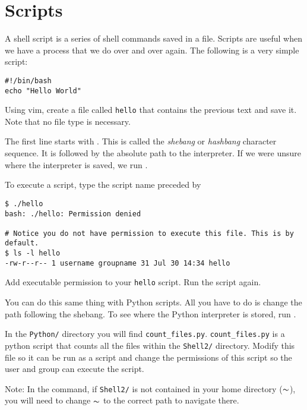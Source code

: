 \section*{Scripts}

A shell script is a series of shell commands saved in a file.
Scripts are useful when we have a process that we do over and over again.
The following is a very simple script:

\begin{lstlisting}
#!/bin/bash
echo "Hello World"
\end{lstlisting}

\begin{problem}
Using vim, create a file called \texttt{hello} that contains the previous text and save it.
Note that no file type is necessary.
\end{problem}

The first line starts with .
This is called the \emph{shebang} or \emph{hashbang} character sequence.
It is followed by the absolute path to the  interpreter.
If we were unsure where the  interpreter is saved, we run .

To execute a script, type the script name preceded by 

\begin{lstlisting}
$ ./hello
bash: ./hello: Permission denied

# Notice you do not have permission to execute this file. This is by default.
$ ls -l hello
-rw-r--r-- 1 username groupname 31 Jul 30 14:34 hello
\end{lstlisting}

\begin{problem}
Add executable permission to your \texttt{hello} script.
Run the script again.
\end{problem}

You can do this same thing with Python scripts.
All you have to do is change the path following the shebang.
To see where the Python interpreter is stored, run .

\begin{problem}
In the \texttt{Python/} directory you will find \texttt{count_files.py}.
\texttt{count_files.py} is a python script that counts all the files within the \texttt{Shell2/} directory.
Modify this file so it can be run as a script and change the permissions of this script so the user and group can execute the script.

Note: In the  command, if \texttt{Shell2/} is not contained in your home directory ($\thicksim$), you will need to change $\thicksim$ to the correct path to navigate there.
\end{problem}

